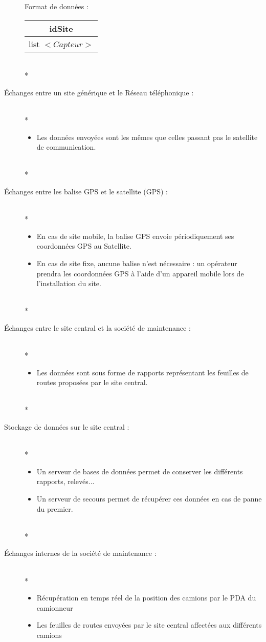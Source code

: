 \begin{description}
	Format de données : 
	\begin{tabular}{|c|}
	\hline
	idSite\\
	\hline
	list $<Capteur>$\\
	\hline
	\end{tabular}
~\\*
\item[Échanges entre un site générique et le Réseau téléphonique :]~\\*
	\begin{itemize}
		\item Les données envoyées sont les mêmes que celles passant pas le satellite de communication.
	\end{itemize}
~\\*
\item[Échanges entre les balise GPS et le satellite (GPS) :] ~\\*
	\begin{itemize}
		\item En cas de site mobile, la balise GPS envoie périodiquement ses coordonnées GPS au Satellite. 
		\item En cas de site fixe, aucune balise n'est nécessaire : un opérateur prendra les coordonnées GPS à l'aide d'un appareil mobile lors de 			l'installation du site.
	\end{itemize}
~\\*
\item[Échanges entre le site central et la société de maintenance :]~\\*
	\begin{itemize}
		\item Les données sont sous forme de rapports représentant les feuilles de routes proposées par le site central.
	\end{itemize}
~\\*
\item[Stockage de données sur le site central :]~\\*
	\begin{itemize}
		\item Un serveur de bases de données permet de conserver les différents rapports, relevés... 
		\item Un serveur de secours permet de récupérer ces données en cas de panne du premier.
	\end{itemize}
~\\*
\item [Échanges internes de la société de maintenance :]~\\*
	\begin{itemize}
		\item Récupération en temps réel de la position des camions par le PDA du camionneur
		\item Les feuilles de routes envoyées par le site central affectées aux différents camions
	\end{itemize}

\end{description}

